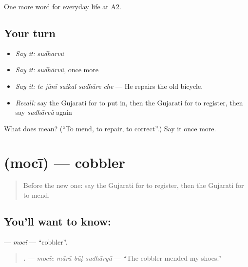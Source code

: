 \begin{grammarlens}[title={What you've built}]
One more word for everyday life at A2.
\end{grammarlens}

\subsection*{Your turn}
\begin{itemize}
\raggedright
  \item \emph{Say it:} \emph{sudhārvũ}
  \item \emph{Say it:} \emph{sudhārvũ}, once more
  \item \emph{Say it:} \emph{te jūnī saikal sudhāre che} — He repairs the old bicycle.
  \item \emph{Recall:} say the Gujarati for to put in, then the Gujarati for to register, then say \emph{sudhārvũ} again
\end{itemize}

\begin{tcolorbox}[breakable,colback=teal!4,colframe=teal!35!black,title={Before you move on}]
What does  mean? (\textquotedblleft{}To mend, to repair, to correct\textquotedblright{}.) Say it once more.
\end{tcolorbox}
\section[\texorpdfstring{\gu{મોચી} (mocī)}{મોચી (mocī)}]{ (mocī) — cobbler}

\label{lesson:GU-C201-moci}



\begin{quote}
Before the new one: say the Gujarati for to register, then the Gujarati for to mend.
\end{quote}

\subsection*{You'll want to know: }
\textbf{} — \emph{mocī} — \textquotedblleft{}cobbler\textquotedblright{}.

\begin{quote}
\textbf{   .} — \emph{mocīe mārā būṭ sudhāryā} — \textquotedblleft{}The cobbler mended my shoes.\textquotedblright{}
\end{quote}

